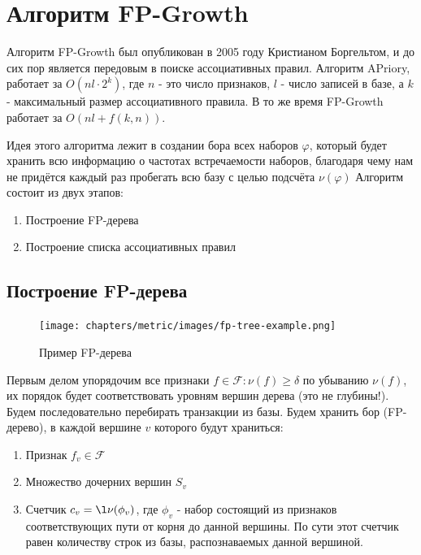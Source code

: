 \section{Алгоритм FP-Growth}
Алгоритм FP-Growth был опубликован в 2005 году Кристианом Боргельтом, и до сих пор является передовым в поиске ассоциативных правил. Алгоритм APriory, работает за $O(nl\cdot 2^k)$, где $n$ - это число признаков, $l$ - число записей в базе, а $k$ - максимальный размер ассоциативного правила. В то же время FP-Growth работает за $O(nl + f(k, n))$.

Идея этого алгоритма лежит в создании бора всех наборов $\varphi$, который будет хранить всю информацию о частотах встречаемости наборов, благодаря чему нам не придётся каждый раз пробегать всю базу с целью подсчёта $\nu(\varphi)$
\newline\newline
Алгоритм состоит из двух этапов:
\begin{enumerate}
    \item Построение FP-дерева
    \item Построение списка ассоциативных правил
\end{enumerate}

\subsection{Построение FP-дерева}

\begin{figure}[h]
    \centering
    \texttt{[image: chapters/metric/images/fp-tree-example.png]}
    \caption{Пример FP-дерева}
\end{figure}

Первым делом упорядочим все признаки $f \in \mathcal{F}: \nu(f) \geq \delta$ по убыванию $\nu(f)$, их порядок будет соответствовать уровням вершин дерева (это не глубины!). Будем последовательно перебирать транзакции из базы. Будем хранить бор (FP-дерево), в каждой вершине $v$ которого будут храниться: 
\begin{enumerate}
    \item Признак $f_v \in \mathcal{F}$
    \item Множество дочерних вершин $S_v$
    \item Счетчик $c_v = \l\nu(\phi_v)$, где $\phi_v$ - набор состоящий из признаков соответствующих пути от корня до данной вершины. По сути этот счетчик равен количеству строк из базы, распознаваемых данной вершиной.
\end{enumerate}

